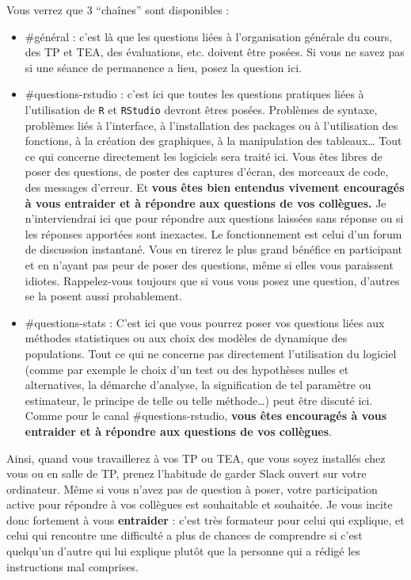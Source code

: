 \documentclass[
  a4paper,
  DIV=11,
  numbers=noendperiod,
  oneside]{scrreprt}
\providecommand{\tightlist}{%
  \setlength{\itemsep}{0pt}\setlength{\parskip}{0pt}}\usepackage{longtable,booktabs,array}
\begin{document}
Vous verrez que 3 ``chaînes'' sont disponibles :

\begin{itemize}
\tightlist
\item
  \#général : c'est là que les questions liées à l'organisation générale
  du cours, des TP et TEA, des évaluations, etc. doivent être posées. Si
  vous ne savez pas si une séance de permanence a lieu, posez la
  question ici.
\item
  \#questions-rstudio : c'est ici que toutes les questions pratiques
  liées à l'utilisation de \texttt{R} et \texttt{RStudio} devront êtres
  posées. Problèmes de syntaxe, problèmes liés à l'interface, à
  l'installation des packages ou à l'utilisation des fonctions, à la
  création des graphiques, à la manipulation des tableaux\ldots{} Tout
  ce qui concerne directement les logiciels sera traité ici. Vous êtes
  libres de poser des questions, de poster des captures d'écran, des
  morceaux de code, des messages d'erreur. Et \textbf{vous êtes bien
  entendus vivement encouragés à vous entraider et à répondre aux
  questions de vos collègues.} Je n'interviendrai ici que pour répondre
  aux questions laissées sans réponse ou si les réponses apportées sont
  inexactes. Le fonctionnement est celui d'un forum de discussion
  instantané. Vous en tirerez le plus grand bénéfice en participant et
  en n'ayant pas peur de poser des questions, même si elles vous
  paraissent idiotes. Rappelez-vous toujours que si vous vous posez une
  question, d'autres se la posent aussi probablement.
\item
  \#questions-stats : C'est ici que vous pourrez poser vos questions
  liées aux méthodes statistiques ou aux choix des modèles de dynamique
  des populations. Tout ce qui ne concerne pas directement l'utilisation
  du logiciel (comme par exemple le choix d'un test ou des hypothèses
  nulles et alternatives, la démarche d'analyse, la signification de tel
  paramètre ou estimateur, le principe de telle ou telle méthode\ldots)
  peut être discuté ici. Comme pour le canal \#questions-rstudio,
  \textbf{vous êtes encouragés à vous entraider et à répondre aux
  questions de vos collègues}.
\end{itemize}

Ainsi, quand vous travaillerez à vos TP ou TEA, que vous soyez installés
chez vous ou en salle de TP, prenez l'habitude de garder Slack ouvert
sur votre ordinateur. Même si vous n'avez pas de question à poser, votre
participation active pour répondre à vos collègues est souhaitable et
souhaitée. Je vous incite donc fortement à vous \textbf{entraider} :
c'est très formateur pour celui qui explique, et celui qui rencontre une
difficulté a plus de chances de comprendre si c'est quelqu'un d'autre
qui lui explique plutôt que la personne qui a rédigé les instructions
mal comprises.
\end{document}
